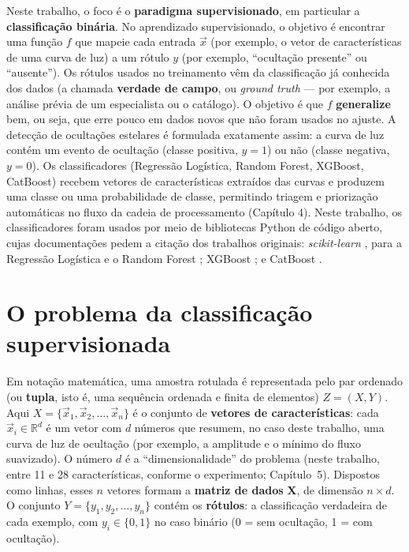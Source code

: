 Neste trabalho, o foco é o \textbf{paradigma supervisionado}, em particular a \textbf{classificação binária}. No aprendizado supervisionado, o objetivo é encontrar uma função \(f\) que mapeie cada entrada \(\vec{x}\) (por exemplo, o vetor de características de uma curva de luz) a um rótulo \(y\) (por exemplo, ``ocultação presente'' ou ``ausente''). Os rótulos usados no treinamento vêm da classificação já conhecida dos dados (a chamada \textbf{verdade de campo}, ou \textit{ground truth} --- por exemplo, a análise prévia de um especialista ou o catálogo). O objetivo é que \(f\) \textbf{generalize} bem, ou seja, que erre pouco em dados novos que não foram usados no ajuste. A detecção de ocultações estelares é formulada exatamente assim: a curva de luz contém um evento de ocultação (classe positiva, \(y=1\)) ou não (classe negativa, \(y=0\)). Os classificadores (Regressão Logística, Random Forest, XGBoost, CatBoost) recebem vetores de características extraídos das curvas e produzem uma classe ou uma probabilidade de classe, permitindo triagem e priorização automáticas no fluxo da cadeia de processamento (Capítulo 4). Neste trabalho, os classificadores foram usados por meio de bibliotecas Python de código aberto, cujas documentações pedem a citação dos trabalhos originais: \textit{scikit-learn} \citep{ScikitLearn2011}, para a Regressão Logística e o Random Forest \citep{Breiman2001}; XGBoost \citep{Chen2016}; e CatBoost \citep{Prokhorenkova2018}.

\section{O problema da classificação supervisionada}
\label{sec:problema_classificacao}
\label{sec:reglin_didatica}

Em notação matemática, uma amostra rotulada é representada pelo par ordenado (ou \textbf{tupla}, isto é, uma sequência ordenada e finita de elementos) \(Z = (X, Y)\). Aqui \(X = \{\vec{x}_1, \vec{x}_2, \ldots, \vec{x}_n\}\) é o conjunto de \textbf{vetores de características}: cada \(\vec{x}_i \in \mathbb{R}^d\) é um vetor com \(d\) números que resumem, no caso deste trabalho, uma curva de luz de ocultação (por exemplo, a amplitude e o mínimo do fluxo suavizado). O número \(d\) é a ``dimensionalidade'' do problema (neste trabalho, entre 11 e 28 características, conforme o experimento; Capítulo~5). Dispostos como linhas, esses \(n\) vetores formam a \textbf{matriz de dados} \(\mathbf{X}\), de dimensão \(n \times d\). O conjunto \(Y =\{y_1, y_2, \ldots, y_n\}\) contém os \textbf{rótulos}: a classificação verdadeira de cada exemplo, com \(y_i \in \{0,1\}\) no caso binário (0 = sem ocultação, 1 = com ocultação).

